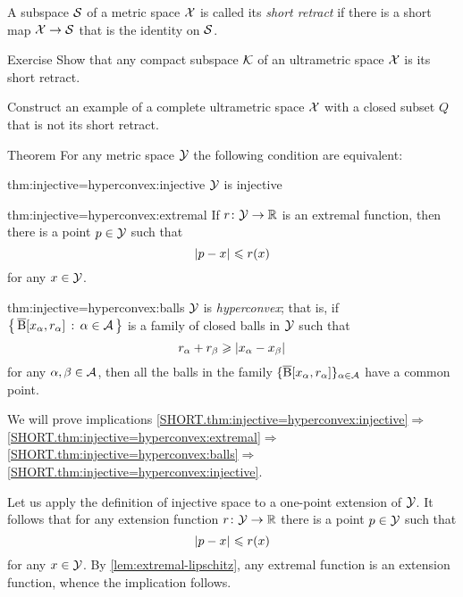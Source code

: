 A subspace $\mathcal{S}$ of a metric space $\mathcal{X}$ is called its \emph{short retract} if there is a short map $\mathcal{X}\to \mathcal{S}$ that is the identity on $\mathcal{S}$.

\begin{thm}{Exercise}\label{ex:ultrametric-converse}
Show that any compact subspace $\mathcal{K}$ of an ultrametric space $\mathcal{X}$ is its short retract.

Construct an example of a complete ultrametric space $\mathcal{X}$ with a closed subset $Q$ that is not its short retract.
\end{thm}


\begin{thm}{Theorem}\label{thm:injective=hyperconvex}
For any metric space $\mathcal{Y}$ the following condition are equivalent:

\begin{subthm}{thm:injective=hyperconvex:injective}
$\mathcal{Y}$ is injective
\end{subthm}


\begin{subthm}{thm:injective=hyperconvex:extremal}
If $r\colon\mathcal{Y}\to\mathbb{R}$ is an extremal function, then there is a point $p\in \mathcal{Y}$ such that 
\[\dist{p}{x}{}\le r(x)\]
for any $x\in \mathcal{Y}$.
\end{subthm}

\begin{subthm}{thm:injective=hyperconvex:balls}
$\mathcal{Y}$ is \emph{hyperconvex};
that is, if $\left\{\,{\overline{\mathrm{B}}{}[x_\alpha,r_\alpha]}\,:\,{\alpha\in\mathcal{A}}\,\right\}$ is a family of closed balls in $\mathcal{Y}$ such that 
 \[r_\alpha+r_\beta\ge \dist{x_\alpha}{x_\beta}{}\]
 for any $\alpha,\beta\in \mathcal{A}$, then all the balls in the family $\{\overline{\mathrm{B}}{}[x_\alpha,r_\alpha]\}_{\alpha\in\mathcal{A}}$ have a common point.
\end{subthm}

\end{thm}

 We will prove implications 
\ref{SHORT.thm:injective=hyperconvex:injective}$\Rightarrow$\ref{SHORT.thm:injective=hyperconvex:extremal}$\Rightarrow$\ref{SHORT.thm:injective=hyperconvex:balls}$\Rightarrow$\ref{SHORT.thm:injective=hyperconvex:injective}.

Let us apply the definition of injective space to a one-point extension of $\mathcal{Y}$.
It follows that for any extension function $r\colon\mathcal{Y}\to\mathbb{R}$ there is a point $p\in \mathcal{Y}$ such that 
\[\dist{p}{x}{}\le r(x)\]
for any $x\in \mathcal{Y}$.
By \ref{lem:extremal-lipschitz}, any extremal function is an extension function, whence the implication follows.

